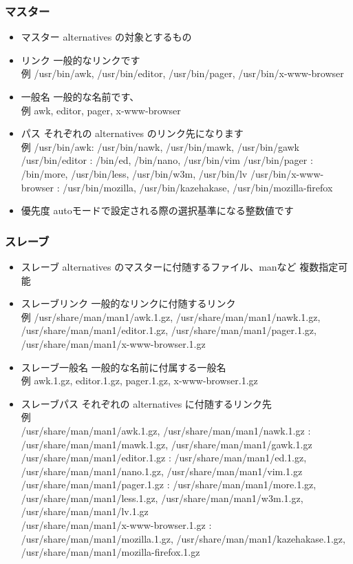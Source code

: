 \documentclass[mingoth,a4paper]{jsarticle}
\begin{document}
\subsubsection{マスター}
\begin{itemize}
 \item 
     マスター  alternatives の対象とするもの
 \item     リンク 一般的なリンクです\\
       例 /usr/bin/awk, /usr/bin/editor, /usr/bin/pager, /usr/bin/x-www-browser
 \item     一般名 一般的な名前です、\\
       例 awk, editor, pager, x-www-browser
 \item     パス それぞれの alternatives のリンク先になります\\
       例 /usr/bin/awk: /usr/bin/nawk, /usr/bin/mawk, /usr/bin/gawk 
          /usr/bin/editor : /bin/ed, /bin/nano, /usr/bin/vim
          /usr/bin/pager : /bin/more, /usr/bin/less, /usr/bin/w3m, /usr/bin/lv
          /usr/bin/x-www-browser : /usr/bin/mozilla, /usr/bin/kazehakase, /usr/bin/mozilla-firefox
 \item     優先度  autoモードで設定される際の選択基準になる整数値です
\end{itemize}
\subsubsection{スレーブ}

\begin{itemize}
 \item 

     スレーブ  alternatives のマスターに付随するファイル、manなど 複数指定可能\\
 \item      スレーブリンク 一般的なリンクに付随するリンク\\
       例 /usr/share/man/man1/awk.1.gz, /usr/share/man/man1/nawk.1.gz, /usr/share/man/man1/editor.1.gz, /usr/share/man/man1/pager.1.gz, /usr/share/man/man1/x-www-browser.1.gz
 \item      スレーブ一般名 一般的な名前に付属する一般名\\
       例 awk.1.gz, editor.1.gz, pager.1.gz, x-www-browser.1.gz
 \item      スレーブパス それぞれの alternatives に付随するリンク先\\
       例 \\ /usr/share/man/man1/awk.1.gz, /usr/share/man/man1/nawk.1.gz : /usr/share/man/man1/mawk.1.gz, /usr/share/man/man1/gawk.1.gz\\
          /usr/share/man/man1/editor.1.gz : /usr/share/man/man1/ed.1.gz, /usr/share/man/man1/nano.1.gz, /usr/share/man/man1/vim.1.gz\\
          /usr/share/man/man1/pager.1.gz : /usr/share/man/man1/more.1.gz, /usr/share/man/man1/less.1.gz, /usr/share/man/man1/w3m.1.gz, /usr/share/man/man1/lv.1.gz\\
          /usr/share/man/man1/x-www-browser.1.gz : /usr/share/man/man1/mozilla.1.gz, /usr/share/man/man1/kazehakase.1.gz, /usr/share/man/man1/mozilla-firefox.1.gz\\
\end{itemize}
\end{document}
